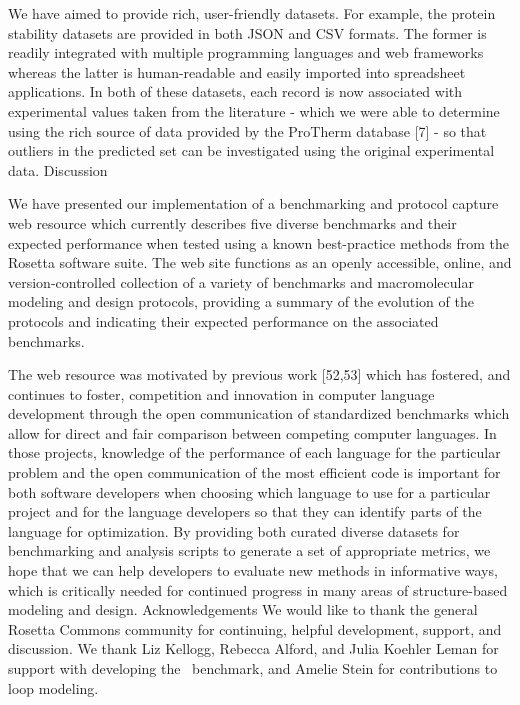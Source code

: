 We have aimed to provide rich, user-friendly datasets. For example, the protein stability datasets are provided in both JSON and CSV formats. The former is readily integrated with multiple programming languages and web frameworks whereas the latter is human-readable and easily imported into spreadsheet applications. In both of these datasets, each record is now associated with experimental values taken from the literature - which we were able to determine using the rich source of data provided by the ProTherm database [7] - so that outliers in the predicted set can be investigated using the original experimental data.
Discussion

We have presented our implementation of a benchmarking and protocol capture web resource which currently describes five diverse benchmarks and their expected performance when tested using a known best-practice methods from the Rosetta software suite. The web site functions as an openly accessible, online, and version-controlled collection of a variety of benchmarks and macromolecular modeling and design protocols, providing a summary of the evolution of the protocols and indicating their expected performance on the associated benchmarks.

The web resource was motivated by previous work [52,53] which has fostered, and continues to foster, competition and innovation in computer language development through the open communication of standardized benchmarks which allow for direct and fair comparison between competing computer languages. In those projects, knowledge of the performance of each language for the particular problem and the open communication of the most efficient code is important for both software developers when choosing which language to use for a particular project and for the language developers so that they can identify parts of the language for optimization. By providing both curated diverse datasets for benchmarking and analysis scripts to generate a set of appropriate metrics, we hope that we can help developers to evaluate new methods in informative ways, which is critically needed for continued progress in many areas of structure-based modeling and design.
Acknowledgements
We would like to thank the general Rosetta Commons community for continuing, helpful development, support, and discussion. We thank Liz Kellogg, Rebecca Alford, and Julia Koehler Leman for support with developing the \ddg\ benchmark, and Amelie Stein for contributions to loop modeling.
